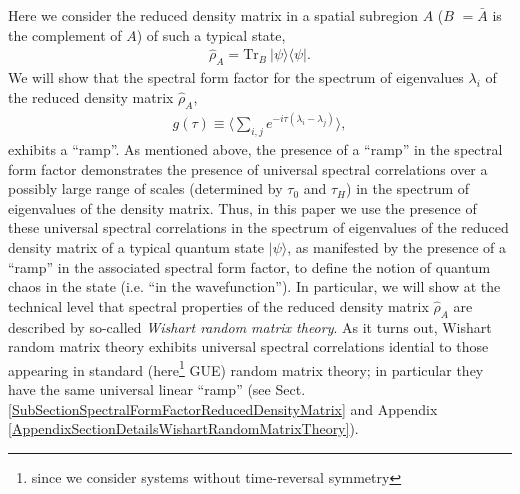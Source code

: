 \documentclass[aps,prb,preprint,onecolumn,amsmath,amssymb,superscriptaddress,eqsecnum,floatfix,scrartcl]{revtex4-1}
\begin{document}
Here we  consider  the reduced density matrix in a spatial subregion $A$  ($B$ $={\bar A}$ is the complement of $A$) of such a typical  state,
\begin{eqnarray}
\label{DEFrhoA}
{\hat  \rho}_A = \mbox{Tr}_B \  |\psi\rangle  \langle \psi|.
\end{eqnarray}
We will show that the spectral form factor for the spectrum of  eigenvalues $\lambda_i$ of  the reduced density matrix  ${\hat  \rho}_A$, 
\begin{eqnarray}
\label{DEFSpectralFormFactor}
g(\tau)\equiv  \langle\sum_{i,j} e^{-i \tau (\lambda_i-\lambda_j)}\rangle, 
\end{eqnarray}
exhibits a ``ramp''.  As mentioned above, the presence of a ``ramp''  in the spectral form factor  demonstrates the presence of 
universal
spectral 
correlations
over a possibly large range of scales (determined by $\tau_0$ and $\tau_H$)  in the spectrum of eigenvalues of the density matrix. 
Thus, in  this paper we use
the presence of these universal spectral correlations
in  the  spectrum of eigenvalues
of the reduced density matrix of a typical quantum state $|\psi\rangle$, as manifested by the presence of a ``ramp'' in the associated spectral
form factor, to define the notion of quantum chaos in the state (i.e. ``in the wavefunction'').
In particular, we will show at the technical level that spectral properties of the reduced density matrix ${\hat \rho}_A$ are described by
so-called {\it Wishart random matrix theory}\cite{loggas}. As it turns out, Wishart random matrix theory exhibits universal spectral correlations
idential to those appearing in
 standard (here\footnote{since we consider systems without time-reversal symmetry}  GUE) random matrix theory; in particular they have the same universal linear ``ramp'' (see Sect. \ref{SubSectionSpectralFormFactorReducedDensityMatrix}
and Appendix \ref{AppendixSectionDetailsWishartRandomMatrixTheory}).
\end{document}
